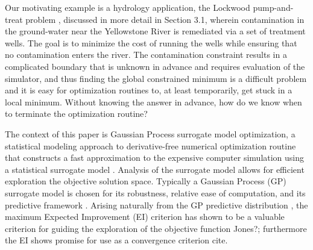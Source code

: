 \documentclass[12pt]{article}
\begin{document}
%
%

%
Our motivating example is a hydrology application, the Lockwood
pump-and-treat problem \cite{lockCite}, discussed in more detail in Section
3.1, wherein contamination in the ground-water near the
Yellowstone River is remediated via a set of treatment wells.  
%
The goal is to minimize the cost of running the wells while ensuring that
no contamination enters the river.  
%
The contamination constraint results in a complicated boundary that is unknown in advance and
requires evaluation of the simulator, and thus finding the global
constrained minimum is a difficult problem and it is easy for
optimization routines to, at least temporarily, get stuck in a local
minimum.  
%
Without knowing the answer in advance, how do we know when
to terminate the optimization routine?


%
%

The context of this paper is Gaussian Process surrogate model
optimization, a statistical modeling approach to derivative-free
numerical optimization routine that constructs a fast approximation to
the expensive computer simulation using a statistical surrogate model \cite{tgp2}.
%
Analysis of the surrogate model allows for efficient exploration the objective solution space.  
%
Typically a Gaussian Process (GP) surrogate model is chosen for its
robustness, relative ease of computation, and its predictive framework
\cite{santnerBook}.
Arising naturally from the GP predictive distribution \cite{gBook, EIPPD}, the maximum Expected Improvement (EI) criterion has shown to be a valuable criterion for guiding the exploration of the objective function \cite{taddyOpt}{\color{red}Jones?}; furthermore the EI shows promise for use as a convergence criterion {\color{red}cite}.
%
\end{document}
